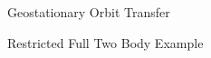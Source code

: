 \begin{frame}{Geostationary Orbit Transfer}
\begin{center}
{    }
    \end{center}
\end{frame}

\begin{frame}{Restricted Full Two Body Example}

\end{frame}
